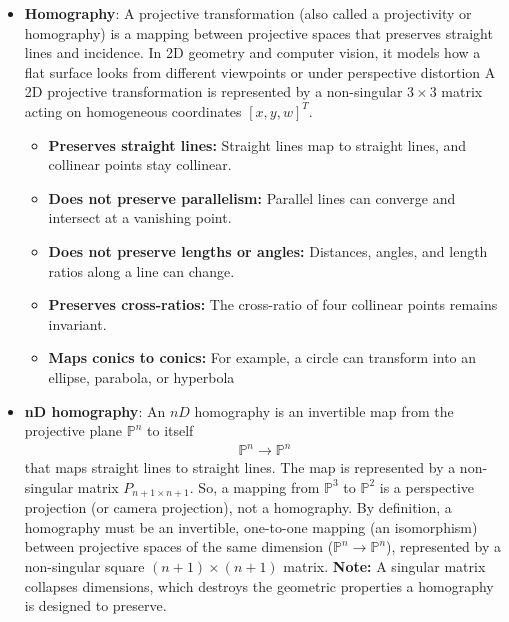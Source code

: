 \documentclass{report}
\begin{document}
\begin{itemize}
        \item \textbf{Homography}: A projective transformation (also called a projectivity or homography) is a mapping between projective spaces that preserves straight lines and incidence. In 2D geometry and computer vision, it models how a flat surface looks from different viewpoints or under perspective distortion
            \bigbreak \noindent 
            A 2D projective transformation is represented by a non-singular $3 \times 3$ matrix acting on homogeneous coordinates \([x, y, w]^T\).
            \begin{itemize}
                \item \textbf{Preserves straight lines:} Straight lines map to straight lines, and collinear points stay collinear.
                \item \textbf{Does not preserve parallelism:} Parallel lines can converge and intersect at a vanishing point.
                \item \textbf{Does not preserve lengths or angles:} Distances, angles, and length ratios along a line can change.
                \item \textbf{Preserves cross-ratios:} The cross-ratio of four collinear points remains invariant.
                \item \textbf{Maps conics to conics:} For example, a circle can transform into an ellipse, parabola, or hyperbola
            \end{itemize}
        \item \textbf{nD homography}: An $nD$ homography is an invertible map from the projective plane $\mathbb{P}^{n}$ to itself
            \begin{align*}
                \mathbb{P}^{n} \to \mathbb{P}^{n}
            \end{align*}
            that maps straight lines to straight lines. The map is represented by a non-singular matrix $P_{n+1\times n+1}$.
            \bigbreak \noindent 
            So, a mapping from \(\mathbb{P}^{3}\) to \(\mathbb{P}^{2}\) is a perspective projection (or camera projection), not a homography. 
            \bigbreak \noindent 
            By definition, a homography must be an invertible, one-to-one mapping (an isomorphism) between projective spaces of the same dimension (\(\mathbb{P}^n \to \mathbb{P}^n\)), represented by a non-singular square $(n+1) \times (n+1)$ matrix.
            \bigbreak \noindent 
            \textbf{Note:} A singular matrix collapses dimensions, which destroys the geometric properties a homography is designed to preserve.

\end{itemize}
\end{document}
